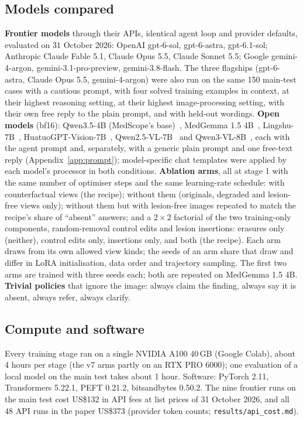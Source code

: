 \documentclass[11pt]{article}
\begin{document}
\subsection{Models compared}
\textbf{Frontier models} through their APIs, identical agent loop and provider defaults, evaluated on 31 October 2026: OpenAI gpt-6-sol, gpt-6-astra, gpt-6.1-sol; Anthropic Claude Fable 5.1, Claude Opus 5.5, Claude Sonnet 5.5; Google gemini-4-argon, gemini-3.1-pro-preview, gemini-3.8-flash. The three flagships (gpt-6-astra, Claude Opus 5.5, gemini-4-argon) were also run on the same 150 main-test cases with a cautious prompt, with four solved training examples in context, at their highest reasoning setting, at their highest image-processing setting, with their own free reply to the plain prompt, and with held-out wordings.
\textbf{Open models} (bf16): Qwen3.5-4B (MedScope's base)~\cite{qwen35}, MedGemma 1.5 4B~\cite{medgemma15}, Lingshu-7B~\cite{lingshu}, HuatuoGPT-Vision-7B~\cite{huatuo}, Qwen2.5-VL-7B~\cite{qwen25vl} and Qwen3-VL-8B~\cite{qwen3vl}, each with the agent prompt and, separately, with a generic plain prompt and one free-text reply (Appendix~\ref{app:prompt}); model-specific chat templates were applied by each model's processor in both conditions.
\textbf{Ablation arms}, all at stage 1 with the same number of optimiser steps and the same learning-rate schedule: with counterfactual views (the recipe); without them (originals, degraded and lesion-free views only); without them but with lesion-free images repeated to match the recipe's share of ``absent'' answers; and a $2\times2$ factorial of the two training-only components, random-removal control edits and lesion insertions: erasures only (neither), control edits only, insertions only, and both (the recipe). Each arm draws from its own allowed view kinds; the seeds of an arm share that draw and differ in LoRA initialisation, data order and trajectory sampling. The first two arms are trained with three seeds each; both are repeated on MedGemma 1.5 4B.
\textbf{Trivial policies} that ignore the image: always claim the finding, always say it is absent, always refer, always clarify.

\subsection{Compute and software}
Every training stage ran on a single NVIDIA A100 40\,GB (Google Colab), about 4 hours per stage (the v7 arms partly on an RTX PRO 6000); one evaluation of a local model on the main test takes about 1 hour. Software: PyTorch 2.11, Transformers 5.22.1, PEFT 0.21.2, bitsandbytes 0.50.2. The nine frontier runs on the main test cost US\$132 in API fees at list prices of 31 October 2026, and all 48 API runs in the paper US\$373 (provider token counts; \texttt{results/api\_cost.md}).
\end{document}
